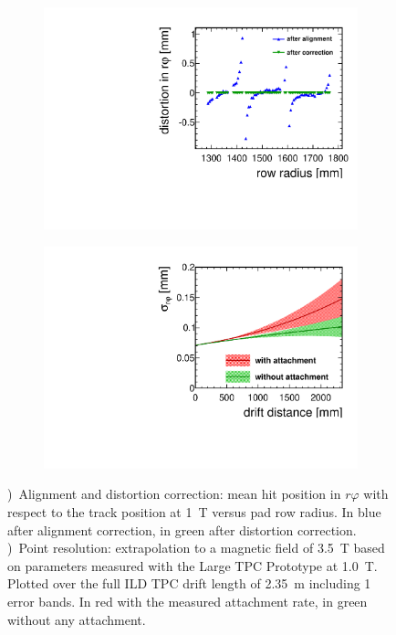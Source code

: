 \begin{figure}[htb!]
\begin{subfigure}[b]{0.48\textwidth}
\includegraphics[width=\textwidth]{Tracker/TPC_Bonn/plots/TPC-DG_distortionAlignmentPaper1Tdistcor.pdf}
\caption{}
\label{sfig:1Tdistort}
\end{subfigure}
\begin{subfigure}[b]{0.48\textwidth}
\includegraphics[width=\textwidth]{Tracker/TPC_Bonn/plots/TPC-DG_xyResolutionExtrapolated.pdf}
\caption{}
\label{sfig:resextrapol}
\end{subfigure}
\caption{\small \protect{})~Alignment and distortion correction: mean hit position in $r\varphi$ with respect to the track position at \SI{1}{T} versus pad row radius. In blue after alignment correction, in green after distortion correction. \protect{})~Point resolution: extrapolation to a magnetic field of \SI{3.5}{T} based on parameters measured with the Large TPC Prototype at \SI{1.0}{T}. Plotted over the full ILD TPC drift length of \SI{2.35}{m} including 1 \sigma error bands. In red with the measured attachment rate, in green without any attachment.}
\label{fig:align1Tdistort}
\end{figure}

